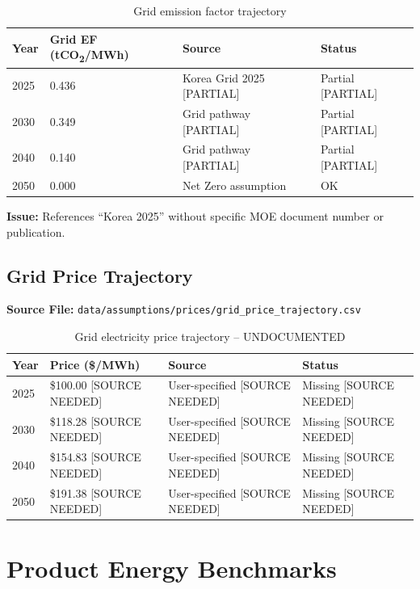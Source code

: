 \documentclass[12pt,a4paper]{article}
\newcommand{\sourceok}[1]{\textcolor{sourcegreen}{#1}}
\newcommand{\nosource}[1]{\textcolor{sourcered}{#1 [SOURCE NEEDED]}}
\newcommand{\partialsource}[1]{\textcolor{sourceyellow}{#1 [PARTIAL]}}
\newcommand{\COtwo}{CO\textsubscript{2}}
\begin{document}
\begin{table}[H]
\centering
\begin{tabular}{llll}
\toprule
\textbf{Year} & \textbf{Grid EF (t\COtwo/MWh)} & \textbf{Source} & \textbf{Status} \\
\midrule
2025 & 0.436 & \partialsource{Korea Grid 2025} & \partialsource{Partial} \\
2030 & 0.349 & \partialsource{Grid pathway} & \partialsource{Partial} \\
2040 & 0.140 & \partialsource{Grid pathway} & \partialsource{Partial} \\
2050 & 0.000 & Net Zero assumption & \sourceok{OK} \\
\bottomrule
\end{tabular}
\caption{Grid emission factor trajectory}
\end{table}

\textbf{Issue:} References ``Korea 2025'' without specific MOE document number or publication.

\subsection{Grid Price Trajectory}
\textbf{Source File:} \texttt{data/assumptions/prices/grid\_price\_trajectory.csv}

\begin{table}[H]
\centering
\begin{tabular}{llll}
\toprule
\textbf{Year} & \textbf{Price (\$/MWh)} & \textbf{Source} & \textbf{Status} \\
\midrule
2025 & \nosource{\$100.00} & \nosource{User-specified} & \nosource{Missing} \\
2030 & \nosource{\$118.28} & \nosource{User-specified} & \nosource{Missing} \\
2040 & \nosource{\$154.83} & \nosource{User-specified} & \nosource{Missing} \\
2050 & \nosource{\$191.38} & \nosource{User-specified} & \nosource{Missing} \\
\bottomrule
\end{tabular}
\caption{Grid electricity price trajectory -- \textcolor{sourcered}{UNDOCUMENTED}}
\end{table}

\section{Product Energy Benchmarks}
\label{sec:benchmarks}
\end{document}

